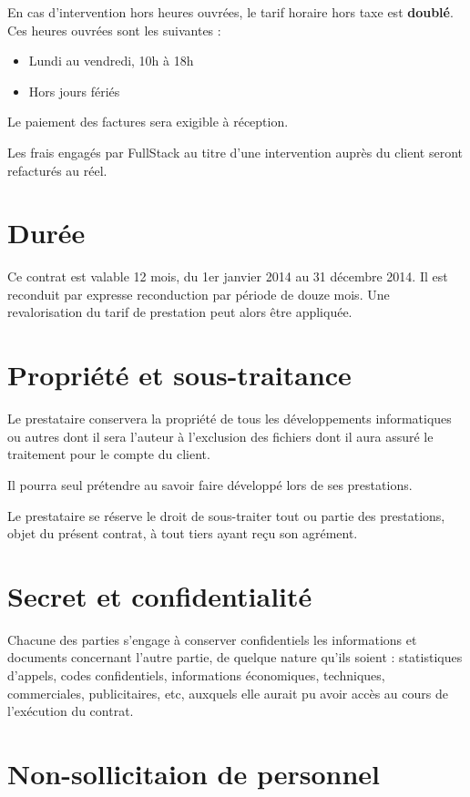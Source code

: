 \documentclass[11pt]{article}
\begin{document}
En cas d'intervention hors heures ouvrées, le tarif horaire hors taxe est \textbf{doublé}. Ces heures ouvrées sont les suivantes :

\begin{itemize}
  \item Lundi au vendredi, 10h à 18h
  \item Hors jours fériés
\end{itemize}

Le paiement des factures sera exigible à réception.

Les frais engagés par FullStack au titre d'une intervention auprès du client seront refacturés au réel.

\section{Durée}

Ce contrat est valable 12 mois, du 1er janvier 2014 au 31 décembre 2014. Il est reconduit par expresse reconduction par période de douze mois. Une revalorisation du tarif de prestation peut alors être appliquée.

\section{Propriété et sous-traitance}

Le prestataire conservera la propriété de tous les développements informatiques ou autres dont il sera l'auteur à l'exclusion des fichiers dont il aura assuré le traitement pour le compte du client.

Il pourra seul prétendre au savoir faire développé lors de ses prestations.

Le prestataire se réserve le droit de sous-traiter tout ou partie des prestations, objet du présent contrat, à tout tiers ayant reçu son agrément.

\section{Secret et confidentialité}

Chacune des parties s'engage à conserver confidentiels les informations et documents concernant l'autre partie, de quelque nature qu'ils soient : statistiques d'appels, codes confidentiels, informations économiques, techniques, commerciales, publicitaires, etc, auxquels elle aurait pu avoir accès au cours de l'exécution du contrat.

\section{Non-sollicitaion de personnel}
\end{document}
